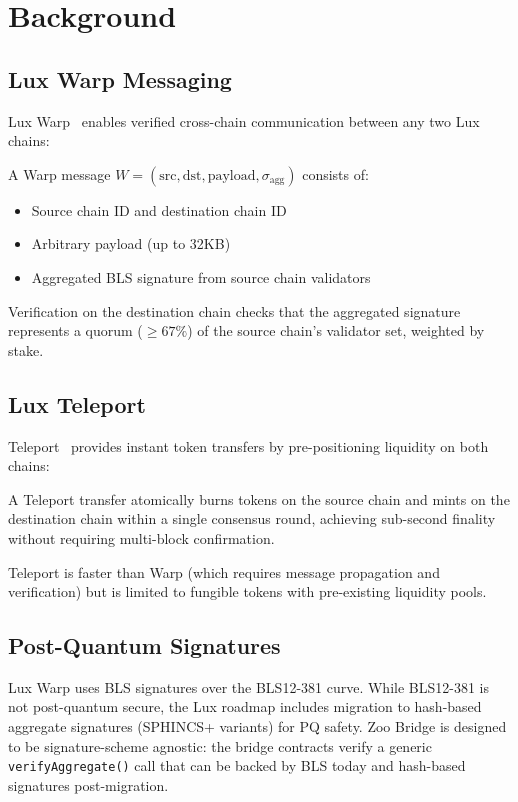 \section{Background}


\subsection{Lux Warp Messaging}

Lux Warp~\cite{lux-warp-messaging} enables verified cross-chain communication between any two Lux chains:

\begin{definition}
A Warp message $W = (\text{src}, \text{dst}, \text{payload}, \sigma_{\text{agg}})$ consists of:
\begin{itemize}
    \item Source chain ID and destination chain ID
    \item Arbitrary payload (up to 32KB)
    \item Aggregated BLS signature from source chain validators
\end{itemize}
\end{definition}

Verification on the destination chain checks that the aggregated signature represents a quorum ($\geq 67\%$) of the source chain's validator set, weighted by stake.

\subsection{Lux Teleport}

Teleport~\cite{lux-teleport-protocol} provides instant token transfers by pre-positioning liquidity on both chains:

\begin{definition}
A Teleport transfer atomically burns tokens on the source chain and mints on the destination chain within a single consensus round, achieving sub-second finality without requiring multi-block confirmation.
\end{definition}

Teleport is faster than Warp (which requires message propagation and verification) but is limited to fungible tokens with pre-existing liquidity pools.

\subsection{Post-Quantum Signatures}

Lux Warp uses BLS signatures over the BLS12-381 curve. While BLS12-381 is not post-quantum secure, the Lux roadmap includes migration to hash-based aggregate signatures (SPHINCS+ variants) for PQ safety. Zoo Bridge is designed to be signature-scheme agnostic: the bridge contracts verify a generic \texttt{verifyAggregate()} call that can be backed by BLS today and hash-based signatures post-migration.

